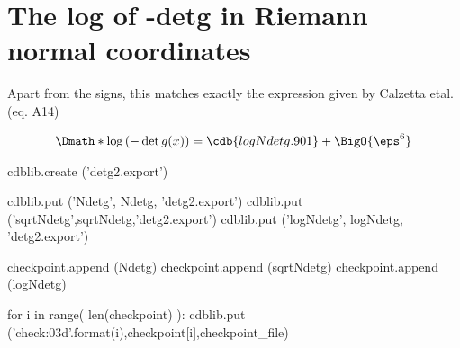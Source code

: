 \documentclass[12pt]{cdblatex}
\begin{document}
\section*{The log of -detg in Riemann normal coordinates}

Apart from the signs, this matches exactly the expression given by Calzetta etal. (eq. A14)

\begin{dgroup*}
   \Dmath*{\log\left(-\det g(x)\right) = \cdb{logNdetg.901}+\BigO{\eps^6}}
\end{dgroup*}

\clearpage


\begin{cadabra}
   cdblib.create ('detg2.export')

   cdblib.put ('Ndetg',    Ndetg,    'detg2.export')
   cdblib.put ('sqrtNdetg',sqrtNdetg,'detg2.export')
   cdblib.put ('logNdetg', logNdetg, 'detg2.export')

   checkpoint.append (Ndetg)
   checkpoint.append (sqrtNdetg)
   checkpoint.append (logNdetg)

\end{cadabra}


\bgroup
{}
\begin{cadabra}
   for i in range( len(checkpoint) ):
      cdblib.put ('check{:03d}'.format(i),checkpoint[i],checkpoint_file)
\end{cadabra}
\egroup
\end{document}
